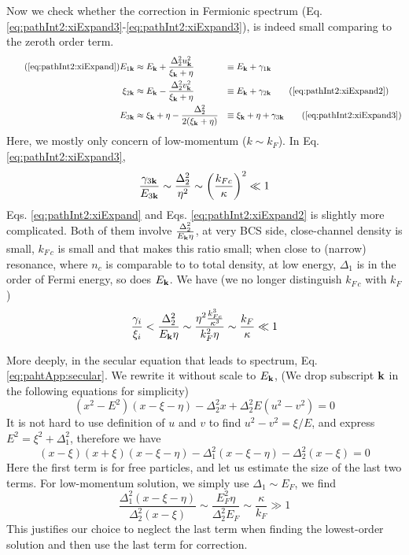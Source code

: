 Now we check whether the correction in Fermionic spectrum (Eq. \ref{eq:pathInt2:xiExpand3}-\ref{eq:pathInt2:xiExpand3}), 
is indeed small comparing to the zeroth order term.  
\begin{align}\tag{\ref{eq:pathInt2:xiExpand}}
E_{1\vk}&\approx{}E_{\vk}+\frac{\Delta_{2}^{2}u_{\vk}^{2}}{\xi_{\vk}+\eta}&\equiv{}&E_{\vk}+\gamma_{1\vk}\\
\xi_{2\vk}&\approx{}E_{\vk}-\frac{\Delta_{2}^{2}v_{\vk}^{2}}{\xi_{\vk}+\eta}&\equiv{}&E_{\vk}+\gamma_{2\vk}
\tag{\ref{eq:pathInt2:xiExpand2}}\\
E_{3\vk}&\approx{}\xi_{\vk}+\eta-\frac{\Delta_{2}^{2}}{2(\xi_{\vk}+\eta)}&\equiv{}&\xi_{\vk}+\eta+\gamma_{3\vk}
\tag{\ref{eq:pathInt2:xiExpand3}}
\end{align}
Here, we mostly only concern of low-momentum ($k\sim{}k_{F}$).  In Eq. \ref{eq:pathInt2:xiExpand3}, 
\begin{equation*}
\frac{\gamma_{3\mathbf{k}}}{E_{3\mathbf{k}}}\sim{}\frac{\Delta_{2}^{2}}{\eta^{2}}\sim\left(\frac{k_{Fc}}{\kappa}\right)^{2}\ll1
\end{equation*}
Eqs. \ref{eq:pathInt2:xiExpand} and Eqs. \ref{eq:pathInt2:xiExpand2} is slightly more complicated.  Both of them involve $\frac{\Delta_{2}^{2}}{E_{\mathbf{k}}\eta}$,  at very BCS side, close-channel density is small, $k_{F\,c}$ is small and that makes this ratio small; when close to (narrow) resonance, where $n_{c}$ is comparable to to total density, at low energy, $\Delta_{1}$ is in the order of Fermi energy, so does $E_{\mathbf{k}}$.   We have (we no longer distinguish $k_{F\,c}$ with $k_{F}$)
 \begin{equation*}
 \frac{\gamma_{i}}{\xi_{i}}<\frac{\Delta_{2}^{2}}{E_{\mathbf{k}}\eta}\sim\frac{\eta^{2}\frac{k_{Fc}^{3}}{\kappa^{3}}}{k_{F}^{2}\eta}\sim\frac{k_{F}}{\kappa}\ll1
\end{equation*}

More deeply, in the secular equation that leads to spectrum, Eq. \ref{eq:pahtApp:secular}.  We rewrite it without scale to $E_{\mathbf{k}}$,  (We drop subscript $\mathbf{k}$ in the following equations for simplicity)
\begin{equation*}
(x^{2}-E^{2})(x-\xi-\eta)-\Delta_{2}^{2}x+\Delta_{2}^{2}E(u^{2}-v^{2})=0
\end{equation*}
It is not hard to use definition of $u$ and $v$ to find $u^{2}-v^{2}=\xi/E$, and express $E^{2}=\xi^{2}+\Delta_{1}^{2}$, therefore we have
\begin{equation*}
(x-\xi)(x+\xi)(x-\xi-\eta)-\Delta_{1}^{2}(x-\xi-\eta)-\Delta_{2}^{2}(x-\xi)=0
\end{equation*}
Here the first term is for free particles, and let us estimate the size of the last two terms.  For low-momentum solution, we simply use $\Delta_{1}\sim{}E_{F}$, we find
\begin{equation*}
\frac{\Delta_{1}^{2}(x-\xi-\eta)}{\Delta_{2}^{2}(x-\xi)}\sim\frac{E_{F}^{2}\eta}{\Delta_{2}^{2}E_{F}}\sim\frac{\kappa}{k_{F}}\gg1
\end{equation*}
This justifies our choice to neglect the last term when finding the lowest-order solution and then use the last term for correction.  

